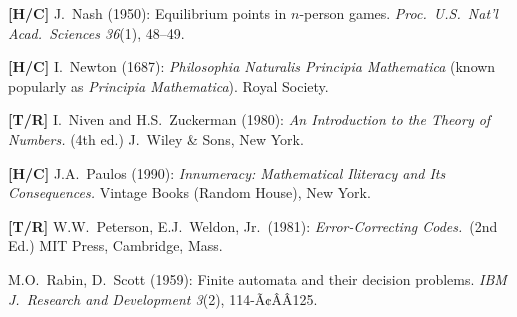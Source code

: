 \begin{thebibliography}{999}




{\bf [H/C]}
J.~Nash (1950): Equilibrium points in $n$-person games.  {\it Proc.~U.S.~Nat'l Acad.~Sciences 36}(1), 48--49.

{\bf [H/C]}
I.~Newton (1687): {\it Philosophia Naturalis Principia Mathematica} (known popularly as {\it Principia Mathematica}).  Royal Society.

{\bf [T/R]}
I.~Niven and H.S.~Zuckerman (1980): {\it An Introduction to the Theory of Numbers.} (4th ed.)
J.~Wiley \& Sons, New York.




{\bf [H/C]}
J.A.~Paulos (1990):
{\it Innumeracy: Mathematical Iliteracy and Its Consequences.}
Vintage Books (Random House), New York.

{\bf [T/R]}
W.W.~Peterson, E.J.~Weldon, Jr.~(1981):
{\it Error-Correcting Codes.}~(2nd Ed.)
MIT Press, Cambridge, Mass.



M.O.~Rabin, D.~Scott (1959): Finite automata and their decision problems.  {\it IBM J.~Research and Development 3}(2), 114-Ã¢ÂÂ125.






\end{thebibliography}
